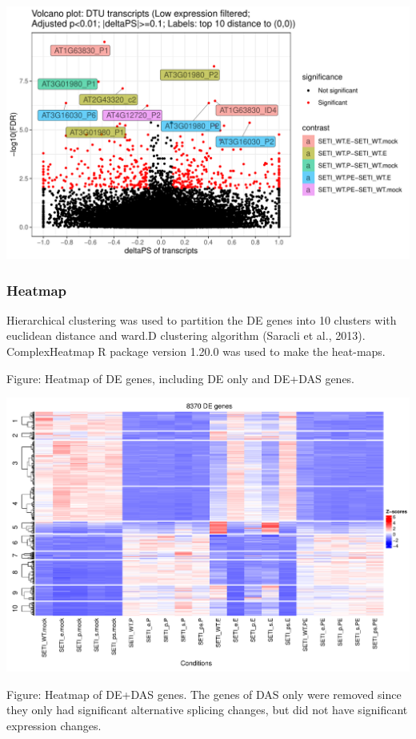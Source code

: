 \documentclass[]{article}
\begin{document}
\includegraphics[width=16.67in]{X2024.08.05.11.24.04.j284/figure/DTU transcripts volcano plot}

\subsubsection{Heatmap}\label{heatmap}

Hierarchical clustering was used to partition the DE genes into 10
clusters with euclidean distance and ward.D clustering algorithm
(Saracli et al., 2013). ComplexHeatmap R package version 1.20.0 was used
to make the heat-maps.

Figure: Heatmap of DE genes, including DE only and DE+DAS genes.

\includegraphics[width=24.58in]{X2024.08.05.11.24.04.j284/figure/Heatmap DE genes}

Figure: Heatmap of DE+DAS genes. The genes of DAS only were removed
since they only had significant alternative splicing changes, but did
not have significant expression changes.
\end{document}
